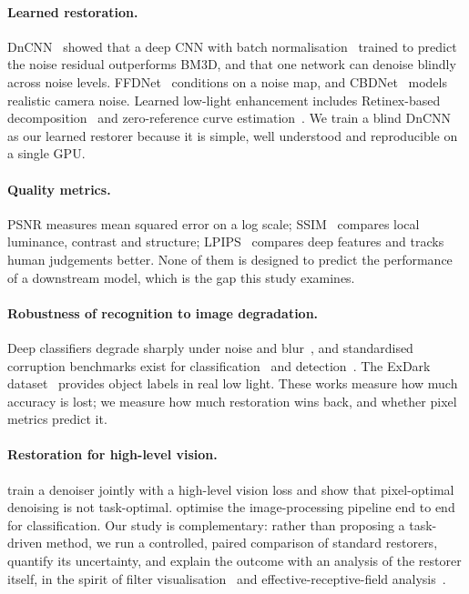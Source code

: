 \documentclass[11pt]{article}
\begin{document}
\paragraph{Learned restoration.}
DnCNN~\citep{zhang2017dncnn} showed that a deep CNN with batch normalisation~\citep{ioffe2015bn} trained to predict the noise residual outperforms BM3D, and that one network can denoise blindly across noise levels. FFDNet~\citep{zhang2018ffdnet} conditions on a noise map, and CBDNet~\citep{guo2019cbdnet} models realistic camera noise. Learned low-light enhancement includes Retinex-based decomposition~\citep{wei2018retinexnet} and zero-reference curve estimation~\citep{guo2020zerodce}. We train a blind DnCNN as our learned restorer because it is simple, well understood and reproducible on a single GPU.

\paragraph{Quality metrics.}
PSNR measures mean squared error on a log scale; SSIM~\citep{wang2004ssim} compares local luminance, contrast and structure; LPIPS~\citep{zhang2018lpips} compares deep features and tracks human judgements better. None of them is designed to predict the performance of a downstream model, which is the gap this study examines.

\paragraph{Robustness of recognition to image degradation.}
Deep classifiers degrade sharply under noise and blur~\citep{dodge2016quality}, and standardised corruption benchmarks exist for classification~\citep{hendrycks2019benchmarking} and detection~\citep{michaelis2019winter}. The ExDark dataset~\citep{loh2019exdark} provides object labels in real low light. These works measure how much accuracy is lost; we measure how much restoration wins back, and whether pixel metrics predict it.

\paragraph{Restoration for high-level vision.}
\citet{liu2018denoising} train a denoiser jointly with a high-level vision loss and show that pixel-optimal denoising is not task-optimal. \citet{diamond2021dirty} optimise the image-processing pipeline end to end for classification. Our study is complementary: rather than proposing a task-driven method, we run a controlled, paired comparison of standard restorers, quantify its uncertainty, and explain the outcome with an analysis of the restorer itself, in the spirit of filter visualisation~\citep{zeiler2014visualizing} and effective-receptive-field analysis~\citep{luo2016erf}.
\end{document}
